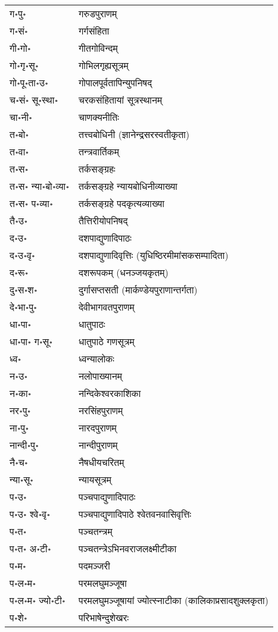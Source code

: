 \begin{longtable}{ll}
ग॰पु॰ & गरुडपुराणम्\\
ग॰सं॰ & गर्गसंहिता\\
गी॰गो॰ & गीतगोविन्दम्\\
गो॰गृ॰सू॰ & गोभिलगृह्यसूत्रम्\\
गो॰पू॰ता॰उ॰ & गोपालपूर्वतापिन्युपनिषद्\\
च॰सं॰ सू॰स्था॰ & चरकसंहितायां सूत्रस्थानम्\\
चा॰नी॰ & चाणक्यनीतिः\\
त॰बो॰ & तत्त्वबोधिनी (ज्ञानेन्द्रसरस्वतीकृता)\\
त॰वा॰ & तन्त्रवार्तिकम्\\
त॰स॰ & तर्कसङ्ग्रहः\\
त॰स॰ न्या॰बो॰व्या॰ & तर्कसङ्ग्रहे न्यायबोधिनीव्याख्या\\
त॰स॰ प॰व्या॰ & तर्कसङ्ग्रहे पदकृत्यव्याख्या\\
तै॰उ॰ & तैत्तिरीयोपनिषद्\\
द॰उ॰ & दशपाद्युणादिपाठः\\
द॰उ॰वृ॰ & दशपाद्युणादिवृत्तिः (युधिष्ठिरमीमांसकसम्पादिता)\\
द॰रू॰ & दशरूपकम् (धनञ्जयकृतम्)\\
दु॰स॰श॰ & दुर्गासप्तसती (मार्कण्डेयपुराणान्तर्गता)\\
दे॰भा॰पु॰ & देवीभागवतपुराणम्\\
धा॰पा॰ & धातुपाठः\\
धा॰पा॰ ग॰सू॰ & धातुपाठे गणसूत्रम्\\
ध्व॰ & ध्वन्यालोकः\\
न॰उ॰ & नलोपाख्यानम्\\
न॰का॰ & नन्दिकेश्वरकाशिका\\
नर॰पु॰ & नरसिंहपुराणम्\\
ना॰पु॰ & नारदपुराणम्\\
नान्दी॰पु॰ & नान्दीपुराणम्\\
नै॰च॰ & नैषधीयचरितम्\\
न्या॰सू॰ & न्यायसूत्रम्\\
प॰उ॰ & पञ्चपाद्युणादिपाठः\\
प॰उ॰ श्वे॰वृ॰ & पञ्चपाद्युणादिपाठे श्वेतवनवासिवृत्तिः\\
प॰त॰ & पञ्चतन्त्रम्\\
प॰त॰ अ॰टी॰ & पञ्चतन्त्रेऽभिनवराजलक्ष्मीटीका\\
प॰म॰ & पदमञ्जरी\\
प॰ल॰म॰ & परमलघुमञ्जूषा\\
प॰ल॰म॰ ज्यो॰टी॰ & परमलघुमञ्जूषायां ज्योत्स्नाटीका (कालिकाप्रसादशुक्लकृता)\\
प॰शे॰ & परिभाषेन्दुशेखरः\\

\end{longtable}
